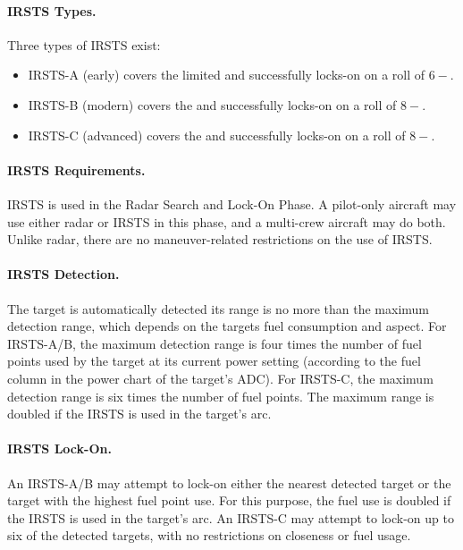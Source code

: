 {\begin{advancedrules}
{\paragraph{IRSTS Types.} Three types of IRSTS exist: 
\begin{itemize}
    \item IRSTS-A (early) covers the limited  and successfully locks-on on a roll of $6-$.
    \item IRSTS-B (modern) covers the   and successfully locks-on on a roll of $8-$.
    \item IRSTS-C (advanced) covers the   and successfully locks-on on a roll of $8-$.
    
\end{itemize}

\paragraph{IRSTS Requirements.}  IRSTS is used in the Radar Search and Lock-On Phase. A pilot-only aircraft may use either radar or IRSTS in this phase, and a multi-crew aircraft may do both. Unlike radar, there are no maneuver-related restrictions on the use of IRSTS.

\paragraph{IRSTS Detection.} The target is automatically detected its range is no more than the maximum detection range, which depends on the targets fuel consumption and aspect. For IRSTS-A/B, the maximum detection range is four times the number of fuel points used by the target at its current power setting (according to the fuel column in the power chart of the target’s ADC). For IRSTS-C, the maximum detection range is six times the number of fuel points. The maximum range is doubled if the IRSTS is used in the target’s  arc. 


\paragraph{IRSTS Lock-On.} An IRSTS-A/B may attempt to lock-on either the nearest detected target or the target with the highest fuel point use. For this purpose, the fuel use is doubled if the IRSTS is used in the target’s   arc. An IRSTS-C may attempt to lock-on up to six of the detected targets, with no restrictions on closeness or fuel usage.

}
\end{advancedrules}}
